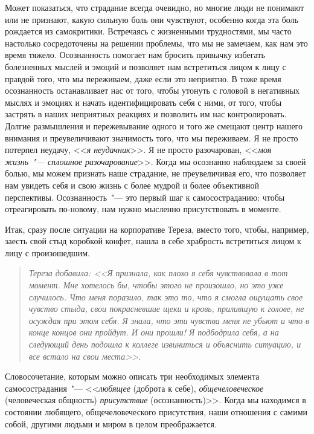Может показаться, что страдание всегда очевидно, но многие люди не понимают или не признают, какую сильную боль они чувствуют, особенно когда эта боль рождается из самокритики. Встречаясь с жизненными трудностями, мы часто настолько сосредоточены на решении проблемы, что мы не замечаем, как нам  это время тяжело. Осознанность помогает нам бросить привычку избегать болезненных мыслей и эмоций и позволяет нам встретиться лицом к лицу с правдой того, что мы переживаем, даже если это неприятно. В тоже время осознанность останавливает нас от того, чтобы утонуть с головой в негативных мыслях и эмоциях и начать идентифицировать себя с ними, от того, чтобы застрять в наших неприятных реакциях и позволить им нас контролировать. Долгие размышления и пережевывание одного и того же смещают центр нашего внимания и преувеличивают значимость того, что мы переживаем. Я не просто потерпел неудачу, <<\emph{я неудачник}>>. Я не просто разочарован, <<\emph{моя жизнь~"--- сплошное разочарование}>>. Когда мы осознанно наблюдаем за своей болью, мы можем признать наше страдание, не преувеличивая его, что позволяет нам увидеть себя и свою жизнь с более мудрой и более объективной перспективы. Осознанность~"--- это первый шаг к самосостраданию: чтобы отреагировать по-новому, нам нужно мысленно присутствовать в моменте.
 
Итак, сразу после ситуации на корпоративе Тереза, вместо того, чтобы, например, заесть свой стыд коробкой конфет, нашла в себе храбрость встретиться лицом к лицу с произошедшим.

\begin{quotation} 
	\textit{
		Тереза добавила: <<Я признала, как плохо я себя чувствовала в тот момент. Мне хотелось бы,  чтобы этого не произошло, но это уже случилось. Что меня поразило, так это то, что я смогла ощущать свое чувство стыда, свои покрасневшие щеки и кровь, прилившую к голове, не осуждая при этом себя. Я знала, что эти чувства меня не убьют и что в конце концов они пройдут. И они прошли! Я подбодрила себя, а на следующий день подошла к коллеге извиниться и объяснить ситуацию, и все встало на свои места>>.
	}
\end{quotation}

Словосочетание, которым можно описать три необходимых элемента самосострадания~"--- <<\emph{любящее} (доброта к себе), \emph{общечеловеческое} (человеческая общность) \emph{присутствие} (осознанность)>>. Когда мы находимся в состоянии любящего, общечеловеческого присутствия, наши отношения с самими собой, другими людьми и миром в целом преображается.

